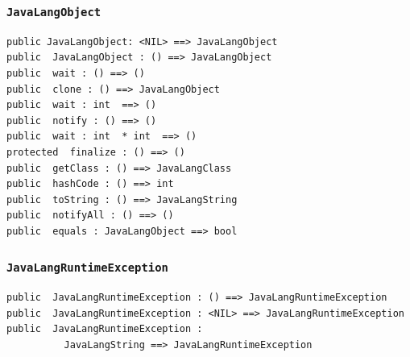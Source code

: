 \documentclass[\pformat,12pt]{article}
\begin{document}
\subsubsection{\texttt{JavaLangObject}}
\begin{small}
\begin{verbatim}
public JavaLangObject: <NIL> ==> JavaLangObject
public  JavaLangObject : () ==> JavaLangObject
public  wait : () ==> ()
public  clone : () ==> JavaLangObject
public  wait : int  ==> ()
public  notify : () ==> ()
public  wait : int  * int  ==> ()
protected  finalize : () ==> ()
public  getClass : () ==> JavaLangClass
public  hashCode : () ==> int
public  toString : () ==> JavaLangString
public  notifyAll : () ==> ()
public  equals : JavaLangObject ==> bool
\end{verbatim}
\end{small}

\subsubsection{\texttt{JavaLangRuntimeException}}
\begin{small}
\begin{verbatim}
public  JavaLangRuntimeException : () ==> JavaLangRuntimeException
public  JavaLangRuntimeException : <NIL> ==> JavaLangRuntimeException
public  JavaLangRuntimeException : 
          JavaLangString ==> JavaLangRuntimeException
\end{verbatim}
\end{small}
\end{document}
